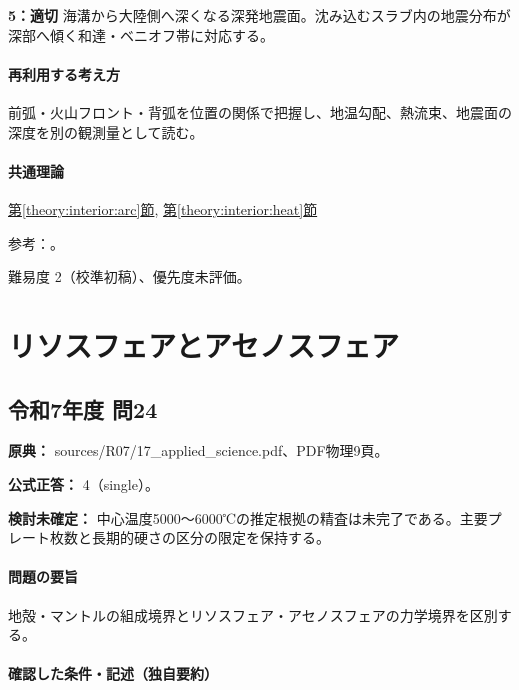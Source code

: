 \noindent\textbf{5：適切} 海溝から大陸側へ深くなる深発地震面。沈み込むスラブ内の地震分布が深部へ傾く和達・ベニオフ帯に対応する。\par

\paragraph{再利用する考え方} 前弧・火山フロント・背弧を位置の関係で把握し、地温勾配、熱流束、地震面の深度を別の観測量として読む。

\paragraph{共通理論} \hyperref[theory:interior:arc]{第\ref*{theory:interior:arc}節}, \hyperref[theory:interior:heat]{第\ref*{theory:interior:heat}節}

\par 参考：\cite{gsj_heat_flow1991,usgs_plate_boundaries}。

\par 難易度 2（校準初稿）、優先度未評価。

\section{リソスフェアとアセノスフェア}

\subsection{令和7年度 問24}
\label{q:r07-reg-applied-24}

\noindent\textbf{原典：} sources/R07/17\_applied\_science.pdf、PDF物理9頁。

\textbf{公式正答：} 4（single）。

\par\textbf{検討未確定：} 中心温度5000〜6000℃の推定根拠の精査は未完了である。主要プレート枚数と長期的硬さの区分の限定を保持する。

\paragraph{問題の要旨} 地殻・マントルの組成境界とリソスフェア・アセノスフェアの力学境界を区別する。

\paragraph{確認した条件・記述（独自要約）}\mbox{}\par

